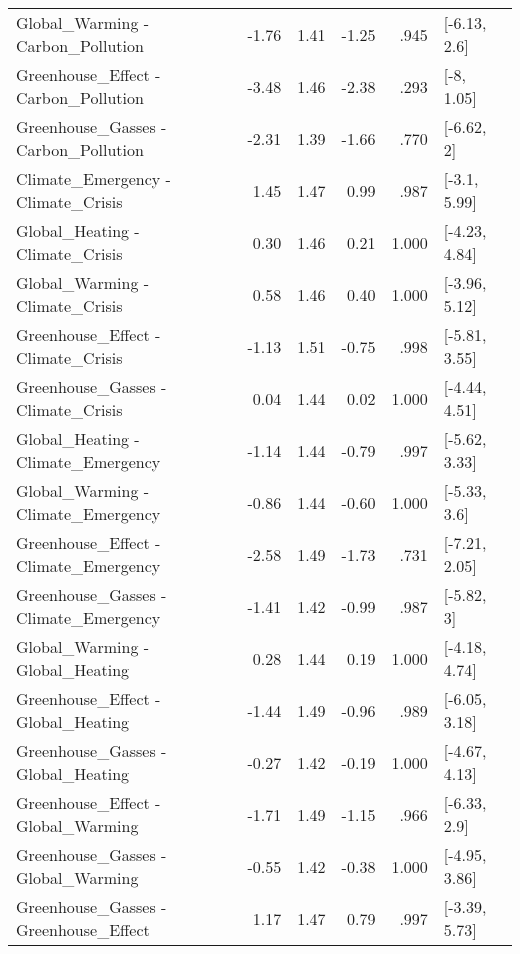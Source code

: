\begin{table}[ht]
\begin{tabular}{lrrrrl}
  Global\_Warming - Carbon\_Pollution & -1.76 & 1.41 & -1.25 & .945 & [-6.13, 2.6] \\ 
  Greenhouse\_Effect - Carbon\_Pollution & -3.48 & 1.46 & -2.38 & .293 & [-8, 1.05] \\ 
  Greenhouse\_Gasses - Carbon\_Pollution & -2.31 & 1.39 & -1.66 & .770 & [-6.62, 2] \\ 
  Climate\_Emergency - Climate\_Crisis & 1.45 & 1.47 & 0.99 & .987 & [-3.1, 5.99] \\ 
  Global\_Heating - Climate\_Crisis & 0.30 & 1.46 & 0.21 & 1.000 & [-4.23, 4.84] \\ 
  Global\_Warming - Climate\_Crisis & 0.58 & 1.46 & 0.40 & 1.000 & [-3.96, 5.12] \\ 
  Greenhouse\_Effect - Climate\_Crisis & -1.13 & 1.51 & -0.75 & .998 & [-5.81, 3.55] \\ 
  Greenhouse\_Gasses - Climate\_Crisis & 0.04 & 1.44 & 0.02 & 1.000 & [-4.44, 4.51] \\ 
  Global\_Heating - Climate\_Emergency & -1.14 & 1.44 & -0.79 & .997 & [-5.62, 3.33] \\ 
  Global\_Warming - Climate\_Emergency & -0.86 & 1.44 & -0.60 & 1.000 & [-5.33, 3.6] \\ 
  Greenhouse\_Effect - Climate\_Emergency & -2.58 & 1.49 & -1.73 & .731 & [-7.21, 2.05] \\ 
  Greenhouse\_Gasses - Climate\_Emergency & -1.41 & 1.42 & -0.99 & .987 & [-5.82, 3] \\ 
  Global\_Warming - Global\_Heating & 0.28 & 1.44 & 0.19 & 1.000 & [-4.18, 4.74] \\ 
  Greenhouse\_Effect - Global\_Heating & -1.44 & 1.49 & -0.96 & .989 & [-6.05, 3.18] \\ 
  Greenhouse\_Gasses - Global\_Heating & -0.27 & 1.42 & -0.19 & 1.000 & [-4.67, 4.13] \\ 
  Greenhouse\_Effect - Global\_Warming & -1.71 & 1.49 & -1.15 & .966 & [-6.33, 2.9] \\ 
  Greenhouse\_Gasses - Global\_Warming & -0.55 & 1.42 & -0.38 & 1.000 & [-4.95, 3.86] \\ 
  Greenhouse\_Gasses - Greenhouse\_Effect & 1.17 & 1.47 & 0.79 & .997 & [-3.39, 5.73] \\ 
   \hline
\end{tabular}
\end{table}
